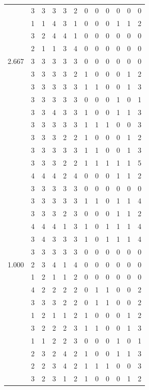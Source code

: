 \documentclass[]{book}
\theoremstyle{definition}
\theoremstyle{definition}
\theoremstyle{definition}
\theoremstyle{remark}
\begin{document}
\begin{table}
{\begin{tabular}[t]{rrrrrrrrrrrr}
 & 3 & 3 & 3 & 3 & 2 & 0 & 0 & 0 & 0 & 0 & 0\\
 & 1 & 1 & 4 & 3 & 1 & 0 & 0 & 0 & 1 & 1 & 2\\
 & 3 & 2 & 4 & 4 & 1 & 0 & 0 & 0 & 0 & 0 & 0\\
 & 2 & 1 & 1 & 3 & 4 & 0 & 0 & 0 & 0 & 0 & 0\\
2.667 & 3 & 3 & 3 & 3 & 3 & 0 & 0 & 0 & 0 & 0 & 0\\
 & 3 & 3 & 3 & 3 & 2 & 1 & 0 & 0 & 0 & 1 & 2\\
 & 3 & 3 & 3 & 3 & 3 & 1 & 1 & 0 & 0 & 1 & 3\\
 & 3 & 3 & 3 & 3 & 3 & 0 & 0 & 0 & 1 & 0 & 1\\
 & 3 & 3 & 4 & 3 & 3 & 1 & 0 & 0 & 1 & 1 & 3\\
 & 3 & 3 & 3 & 3 & 3 & 1 & 1 & 1 & 0 & 0 & 3\\
 & 3 & 3 & 3 & 2 & 2 & 1 & 0 & 0 & 0 & 1 & 2\\
 & 3 & 3 & 3 & 3 & 3 & 1 & 1 & 0 & 0 & 1 & 3\\
 & 3 & 3 & 3 & 2 & 2 & 1 & 1 & 1 & 1 & 1 & 5\\
 & 4 & 4 & 4 & 2 & 4 & 0 & 0 & 0 & 1 & 1 & 2\\
 & 3 & 3 & 3 & 3 & 3 & 0 & 0 & 0 & 0 & 0 & 0\\
 & 3 & 3 & 3 & 3 & 3 & 1 & 1 & 0 & 1 & 1 & 4\\
 & 3 & 3 & 3 & 2 & 3 & 0 & 0 & 0 & 1 & 1 & 2\\
 & 4 & 4 & 4 & 1 & 3 & 1 & 0 & 1 & 1 & 1 & 4\\
 & 3 & 4 & 3 & 3 & 3 & 1 & 0 & 1 & 1 & 1 & 4\\
 & 3 & 3 & 3 & 3 & 3 & 0 & 0 & 0 & 0 & 0 & 0\\
1.000 & 2 & 3 & 4 & 1 & 4 & 0 & 0 & 0 & 0 & 0 & 0\\
 & 1 & 2 & 1 & 1 & 2 & 0 & 0 & 0 & 0 & 0 & 0\\
 & 4 & 2 & 2 & 2 & 2 & 0 & 1 & 1 & 0 & 0 & 2\\
 & 3 & 3 & 3 & 2 & 2 & 0 & 1 & 1 & 0 & 0 & 2\\
 & 1 & 2 & 1 & 1 & 2 & 1 & 0 & 0 & 0 & 1 & 2\\
 & 3 & 2 & 2 & 2 & 3 & 1 & 1 & 0 & 0 & 1 & 3\\
 & 1 & 1 & 2 & 2 & 3 & 0 & 0 & 0 & 1 & 0 & 1\\
 & 2 & 3 & 2 & 4 & 2 & 1 & 0 & 0 & 1 & 1 & 3\\
 & 2 & 2 & 3 & 4 & 2 & 1 & 1 & 1 & 0 & 0 & 3\\
 & 3 & 2 & 3 & 1 & 2 & 1 & 0 & 0 & 0 & 1 & 2\\

\end{tabular}}
\end{table}
\end{document}

